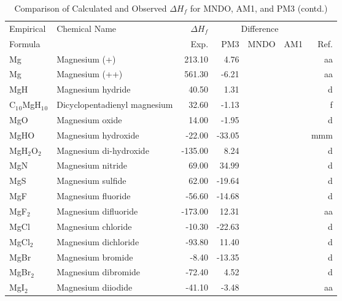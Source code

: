 \begin{table}
\caption{Comparison of Calculated and Observed $\Delta H_f$ 
for MNDO, AM1, and PM3 (contd.)}
\begin{center}
\compresstable
\begin{tabular}{llrrrrr}
Empirical & Chemical Name & $\Delta H_f$ & \multicolumn{3}{c}{Difference} & \\
Formula   &               & Exp. & PM3 &  MNDO  &  AM1 &     Ref.\\
\hline
 Mg          & Magnesium (+)                   &   213.10    &     4.76  &  &  &     aa\\
 Mg          & Magnesium (++)                  &   561.30    &    -6.21  &  &  &     aa\\
 MgH         & Magnesium hydride               &    40.50    &     1.31  &  &  &      d\\
 C$_1$$_0$MgH$_1$$_0$    & Dicyclopentadienyl magnesium    &    32.60    &    -1.13  &  &  &      f\\
 MgO         & Magnesium oxide                 &    14.00    &    -1.95  &  &  &      d\\
 MgHO        & Magnesium hydroxide             &   -22.00    &   -33.05  &  &  &    mmm\\
 MgH$_2$O$_2$      & Magnesium di-hydroxide          &  -135.00    &     8.24  &  &  &      d\\
 MgN         & Magnesium nitride               &    69.00    &    34.99  &  &  &      d\\
 MgS         & Magnesium sulfide               &    62.00    &   -19.64  &  &  &      d\\
 MgF         & Magnesium fluoride              &   -56.60    &   -14.68  &  &  &      d\\
 MgF$_2$        & Magnesium difluoride            &  -173.00    &    12.31  &  &  &     aa\\
 MgCl        & Magnesium chloride              &   -10.30    &   -22.63  &  &  &      d\\
 MgCl$_2$       & Magnesium dichloride            &   -93.80    &    11.40  &  &  &      d\\
 MgBr        & Magnesium bromide               &    -8.40    &   -13.35  &  &  &      d\\
 MgBr$_2$       & Magnesium dibromide             &   -72.40    &     4.52  &  &  &      d\\
 MgI$_2$        & Magnesium diiodide              &   -41.10    &    -3.48  &  &  &     aa\\

\end{tabular}
\end{center}
\end{table}
